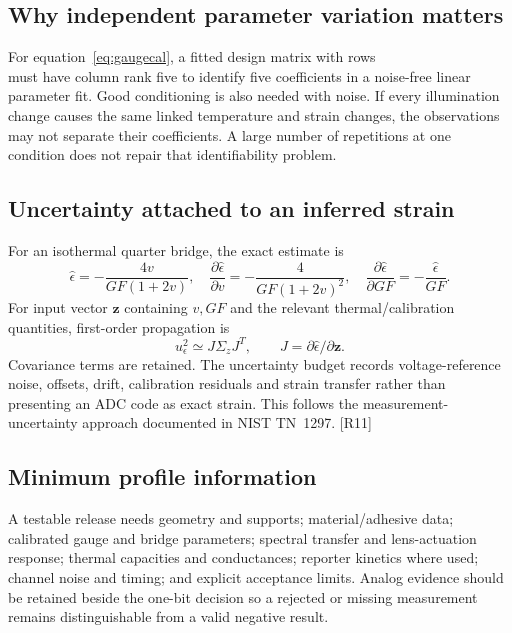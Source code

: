 \documentclass[10pt,a4paper]{article}
\numberwithin{equation}{section}
\begin{document}
\subsection*{Why independent parameter variation matters}
For equation~\eqref{eq:gaugecal}, a fitted design matrix with rows
\begin{equation}
[\,1,\ \epsilon,\ \Delta T,\ \epsilon\Delta T,\ \epsilon^2\,]
\end{equation}
must have column rank five to identify five coefficients in a noise-free linear parameter fit. Good conditioning is also needed with noise. If every illumination change causes the same linked temperature and strain changes, the observations may not separate their coefficients. A large number of repetitions at one condition does not repair that identifiability problem.

\subsection*{Uncertainty attached to an inferred strain}
For an isothermal quarter bridge, the exact estimate is
\begin{equation}
\widehat\epsilon=-\frac{4v}{GF(1+2v)},\quad
\frac{\partial\widehat\epsilon}{\partial v}=-\frac4{GF(1+2v)^2},\quad
\frac{\partial\widehat\epsilon}{\partial GF}=-\frac{\widehat\epsilon}{GF}.
\end{equation}
For input vector $\bm z$ containing $v,GF$ and the relevant thermal/calibration quantities, first-order propagation is
\begin{equation}
u_\epsilon^2\simeq J\Sigma_zJ^T,\qquad J=\partial\widehat\epsilon/\partial\bm z.
\end{equation}
Covariance terms are retained. The uncertainty budget records voltage-reference noise, offsets, drift, calibration residuals and strain transfer rather than presenting an ADC code as exact strain. This follows the measurement-uncertainty approach documented in NIST TN~1297. [R11]

\subsection*{Minimum profile information}
A testable release needs geometry and supports; material/adhesive data; calibrated gauge and bridge parameters; spectral transfer and lens-actuation response; thermal capacities and conductances; reporter kinetics where used; channel noise and timing; and explicit acceptance limits. Analog evidence should be retained beside the one-bit decision so a rejected or missing measurement remains distinguishable from a valid negative result.
\end{document}
